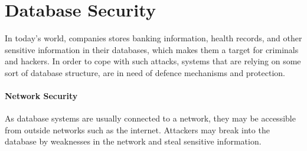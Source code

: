 \section{Database Security}
\label{chp:database_Security}

In today's world, companies stores banking information, health records, and other sensitive information in their databases, which makes them a target for criminals and hackers. In order to cope with such attacks, systems that are relying on some sort of database structure, are in need of defence mechanisms and protection.

%
%


\paragraph{Network Security}

As database systems are usually connected to a network, they may be accessible from outside networks such as the internet. Attackers may break into the database by weaknesses in the network and steal sensitive information.

